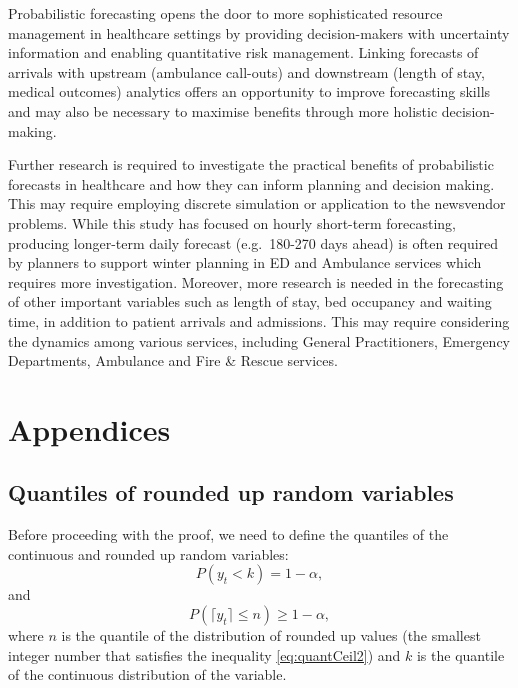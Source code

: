 \documentclass[]{elsarticle} %
\begin{document}
Probabilistic forecasting opens the door to more sophisticated resource management in healthcare settings by providing decision-makers with uncertainty information and enabling quantitative risk management. Linking forecasts of arrivals with upstream (ambulance call-outs) and downstream (length of stay, medical outcomes) analytics offers an opportunity to improve forecasting skills and may also be necessary to maximise benefits through more holistic decision-making.

Further research is required to investigate the practical benefits of probabilistic forecasts in healthcare and how they can inform planning and decision making. This may require employing discrete simulation or application to the newsvendor problems. While this study has focused on hourly short-term forecasting, producing longer-term daily forecast (e.g.~180-270 days ahead) is often required by planners to support winter planning in ED and Ambulance services which requires more investigation. Moreover, more research is needed in the forecasting of other important variables such as length of stay, bed occupancy and waiting time, in addition to patient arrivals and admissions. This may require considering the dynamics among various services, including General Practitioners, Emergency Departments, Ambulance and Fire \& Rescue services.

\hypertarget{appendices}{%
\section{Appendices}\label{appendices}}

\hypertarget{quantilesceiling}{%
\subsection{Quantiles of rounded up random variables}\label{quantilesceiling}}

Before proceeding with the proof, we need to define the quantiles of the continuous and rounded up random variables:
\begin{equation} \label{eq:quantCeil1}
    P \left(y_t < k \right) = 1 - \alpha ,
\end{equation}
and
\begin{equation} \label{eq:quantCeil2}
    P \left(\lceil y_t \rceil \leq n \right) \geq 1 - \alpha ,
\end{equation}
where \(n\) is the quantile of the distribution of rounded up values (the smallest integer number that satisfies the inequality \eqref{eq:quantCeil2}) and \(k\) is the quantile of the continuous distribution of the variable.
\end{document}
